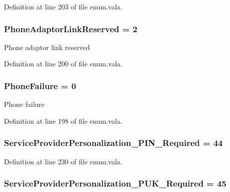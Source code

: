 Definition at line 203 of file enum.\-vala.

\hypertarget{enum_8vala_ad9f2ca814fd721e232c0641e1994be85}{
\subsubsection[{Phone\-Adaptor\-Link\-Reserved}]{\setlength{\rightskip}{0pt plus 5cm}Phone\-Adaptor\-Link\-Reserved = 2}}\label{enum_8vala_ad9f2ca814fd721e232c0641e1994be85}
Phone adaptor link reserved 

Definition at line 200 of file enum.\-vala.

\hypertarget{enum_8vala_a96e9dc13dbad210259144d31fb47d3d5}{
\subsubsection[{Phone\-Failure}]{\setlength{\rightskip}{0pt plus 5cm}Phone\-Failure = 0}}\label{enum_8vala_a96e9dc13dbad210259144d31fb47d3d5}
Phone failure 

Definition at line 198 of file enum.\-vala.

\hypertarget{enum_8vala_a66c3a62a24b73d4d11ca9db7fa460733}{
\subsubsection[{Service\-Provider\-Personalization\-\_\-\-P\-I\-N\-\_\-\-Required}]{\setlength{\rightskip}{0pt plus 5cm}Service\-Provider\-Personalization\-\_\-\-P\-I\-N\-\_\-\-Required = 44}}\label{enum_8vala_a66c3a62a24b73d4d11ca9db7fa460733}


Definition at line 230 of file enum.\-vala.

\hypertarget{enum_8vala_a255b6c1368460cd70e46ba73f3a130b9}{
\subsubsection[{Service\-Provider\-Personalization\-\_\-\-P\-U\-K\-\_\-\-Required}]{\setlength{\rightskip}{0pt plus 5cm}Service\-Provider\-Personalization\-\_\-\-P\-U\-K\-\_\-\-Required = 45}}\label{enum_8vala_a255b6c1368460cd70e46ba73f3a130b9}


